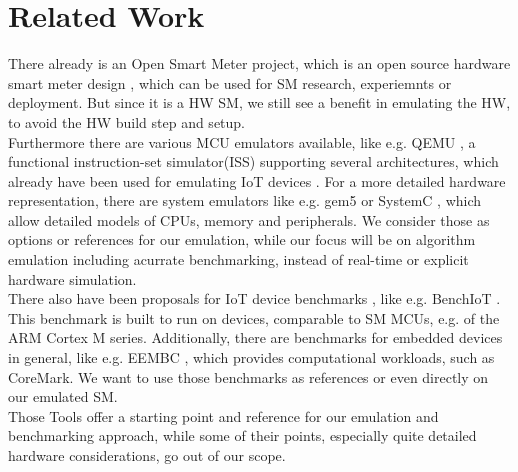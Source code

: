 \documentclass[english]{tudscrartcl}
\begin{document}
	\section{Related Work}
	There already is an Open Smart Meter project, which is an open source hardware smart meter design \cite{OSM-WebSite, OSM-GitHub},
	which can be used for SM research, experiemnts or deployment.
	But since it is a HW SM, we still see a benefit in emulating the HW, to avoid the HW build step and setup.
	\\ %
	Furthermore there are various MCU emulators available, like e.g. QEMU \cite{QEMU-WebSite}, a functional instruction-set simulator(ISS) supporting several architectures,
	which already have been used for emulating IoT devices \cite{66920, 10.1007/978-3-031-47457-6_5}.
	For a more detailed hardware representation, there are system emulators like e.g. gem5 \cite{gem5-WebSite} or SystemC \cite{1193229},
	which allow detailed models of CPUs, memory and peripherals. We consider those as options or references for our emulation,
	while our focus will be on algorithm emulation including acurrate benchmarking, instead of real-time or explicit hardware simulation.
  	\\ %
  	There also have been proposals for IoT device benchmarks \cite{6945583, 8802949}, like e.g. BenchIoT \cite{8809492}.
	This benchmark is built to run on devices, comparable to SM MCUs, e.g. of the ARM Cortex M series.
	Additionally, there are benchmarks for embedded devices in general, like e.g. EEMBC \cite{EEMBC-WebSite},
	which provides computational workloads, such as CoreMark.
	We want to use those benchmarks as references or even directly on our emulated SM.
	\\ %
	Those Tools offer a starting point and reference for our emulation and benchmarking approach,
	while some of their points, especially quite detailed hardware considerations, go out of our scope.
\end{document}
